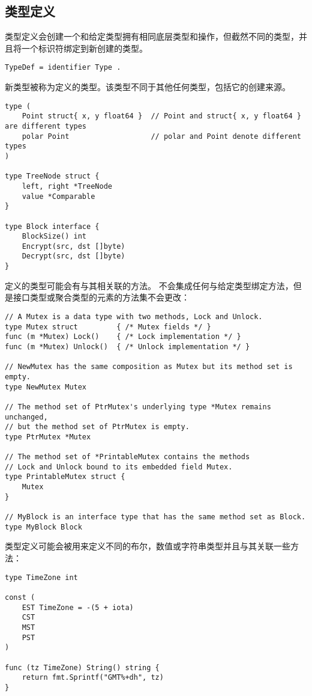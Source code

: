 \subsection{类型定义}
类型定义会创建一个和给定类型拥有相同底层类型和操作，但截然不同的类型，并且将一个标识符绑定到新创建的类型。
\begin{lstlisting}[style=golang]
TypeDef = identifier Type .
\end{lstlisting}
新类型被称为定义的类型。该类型不同于其他任何类型，包括它的创建来源。
\begin{lstlisting}[style=golang]
type (
	Point struct{ x, y float64 }  // Point and struct{ x, y float64 } are different types
	polar Point                   // polar and Point denote different types
)

type TreeNode struct {
	left, right *TreeNode
	value *Comparable
}

type Block interface {
	BlockSize() int
	Encrypt(src, dst []byte)
	Decrypt(src, dst []byte)
}
\end{lstlisting}
定义的类型可能会有与其相关联的方法。
不会集成任何与给定类型绑定方法，但是接口类型或聚合类型的元素的方法集不会更改：
\begin{lstlisting}[style=golang]
// A Mutex is a data type with two methods, Lock and Unlock.
type Mutex struct         { /* Mutex fields */ }
func (m *Mutex) Lock()    { /* Lock implementation */ }
func (m *Mutex) Unlock()  { /* Unlock implementation */ }

// NewMutex has the same composition as Mutex but its method set is empty.
type NewMutex Mutex

// The method set of PtrMutex's underlying type *Mutex remains unchanged,
// but the method set of PtrMutex is empty.
type PtrMutex *Mutex

// The method set of *PrintableMutex contains the methods
// Lock and Unlock bound to its embedded field Mutex.
type PrintableMutex struct {
	Mutex
}

// MyBlock is an interface type that has the same method set as Block.
type MyBlock Block
\end{lstlisting}

类型定义可能会被用来定义不同的布尔，数值或字符串类型并且与其关联一些方法：
\begin{lstlisting}[style=golang]
type TimeZone int

const (
	EST TimeZone = -(5 + iota)
	CST
	MST
	PST
)

func (tz TimeZone) String() string {
	return fmt.Sprintf("GMT%+dh", tz)
}
\end{lstlisting}

